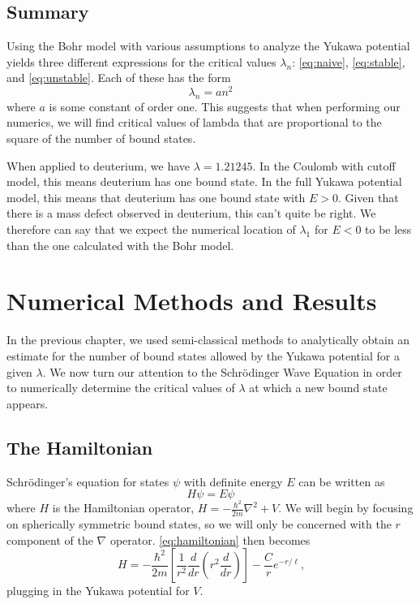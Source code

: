 \documentclass[12pt,twoside]{reedthesis}
\newcommand{\eqn}[1]{\begin{equation}#1\end{equation}}
\begin{document}
\section{Summary}
Using the Bohr model with various assumptions to analyze the Yukawa potential yields three different expressions for the critical values $\lambda_n$: \eqref{eq:naive}, \eqref{eq:stable}, and \eqref{eq:unstable}. Each of these has the form 
\eqn{
\lambda_{n} = a n^2
}
where $a$ is some constant of order one. This suggests that when performing our numerics, we will find critical values of lambda that are proportional to the square of the number of bound states. 

When applied to deuterium, we have $\lambda = 1.21245$. In the Coulomb with cutoff model, this means deuterium has one bound state. In the full Yukawa potential model, this means that deuterium has one bound state with $E > 0$. Given that there is a mass defect observed in deuterium, this can't quite be right. We therefore can say that we expect the numerical location of $\lambda_1$ for $E < 0$ to be less than the one calculated with the Bohr model.

\clearpage %

\chapter{Numerical Methods and Results}

In the previous chapter, we used semi-classical methods to analytically obtain an estimate for the number of bound states allowed by the Yukawa potential for a given $\lambda$.  We now turn our attention to the Schr\"odinger Wave Equation in order to numerically determine the critical values of $\lambda$ at which a new bound state appears.

\section{The Hamiltonian}

Schr\"odinger's equation for states $\psi$ with definite energy $E$ can be written as
\eqn{
H \psi = E\psi
\label{eq:hamiltonian}
}
where $H$ is the Hamiltonian operator, $H =-\frac{\hbar^2}{2m}\nabla^2 +V$.  We will begin by focusing on spherically symmetric bound states, so we will only be concerned with the $r$ component of the $\nabla$ operator. \eqref{eq:hamiltonian} then becomes
\eqn{
H = -\frac{\hbar^2}{2m} \left[\frac{1}{r^2}\frac{d}{dr}\left(r^2 \frac{d}{dr}\right)\right] - \frac{C}{r}e^{-r/\ell}\mbox{,}
}
plugging in the Yukawa potential for $V$.
\end{document}
